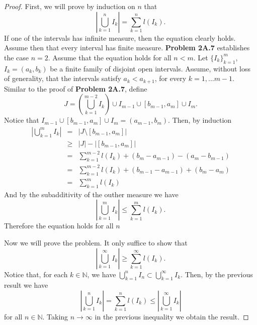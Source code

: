 \documentclass[14.5pt]{article}
\newcommand{\N}{\mathbb{N}}
\begin{document}
\begin{proof}
First, we will prove by induction on $n$ that
$$\left| \bigcup_{k=1}^n I_k \right| = \sum
_{k=1}^n l(I_k).$$
If one of the intervals has infinite measure, then the equation clearly holds. 
Assume then that every interval has finite measure. \textbf{Problem 2A.7} establishes the case $n=2.$ Assume that the equation holds for all $n < m$. Let $\{I_k\}_{k=1}^m$, $I_k = (a_k, b_k)$ be a finite family of disjoint open intervals. Assume, without loss of generality, that the intervals satisfy $a_k < a_{k+1}$, for every $k =1, \ldots m-1.$ Similar to the proof of \textbf{Problem 2A.7}, define
$$ J = \left(\bigcup_{k=1}^{m-2} I_k\right) \cup I_{m-1} \cup [b_{m-1}, a_m] \cup I_m.$$
Notice that $I_{m-1} \cup [b_{m-1}, a_m] \cup I_m = (a_{m-1}, b_m).$ Then, by induction
\begin{eqnarray*}
\left| \bigcup_{k=1}^{m} I_k \right| &=& | J \setminus [b_{m-1}, a_m] | \\
&\geq& | J | - | [b_{m-1}, a_m] | \\
&=& \sum_{k=1}^{m-2}l(I_k) + (b_m - a_{m-1}) - (a_m - b_{m-1}) \\
&=& \sum_{k=1}^{m-2}l(I_k) + (b_{m-1} - a_{m-1}) + (b_m - a_{m}) \\
&=& \sum_{k=1}^{m}l(I_k)
\end{eqnarray*}
And by the subadditivity of the outher measure we have 
$$\left| \bigcup_{k=1}^m I_k \right| \leq \sum
_{k=1}^m l(I_k).$$
Therefore the equation holds for all $n$

Now we will prove the problem. It only suffice to show that 
$$\left\lvert \bigcup_{k=1}^\infty I_k\right\rvert \geq \sum_{k=1}^\infty l(I_k).$$
Notice that, for each $k \in \N$, we have $\bigcup_{k=1}^n I_n \subset \bigcup_{k=1}^\infty I_k.$ Then, by the previous result we have
$$\left\lvert \bigcup_{k=1}^n I_k\right\rvert =  \sum_{k=1}^n l(I_k) \leq \left\lvert \bigcup_{k=1}^\infty I_k\right\rvert$$
for all $n \in \N.$ Taking $n \to \infty$ in the previous inequality we obtain the result.
\end{proof}
\end{document}
